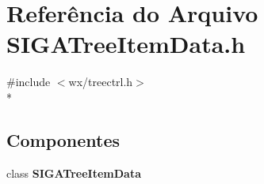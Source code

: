 \section{Referência do Arquivo S\+I\+G\+A\+Tree\+Item\+Data.\+h}
\label{_s_i_g_a_tree_item_data_8h}
{\ttfamily \#include $<$wx/treectrl.\+h$>$}\\*
\subsection*{Componentes}
\begin{DoxyCompactItemize}
\item 
class {\bf S\+I\+G\+A\+Tree\+Item\+Data}
\end{DoxyCompactItemize}
